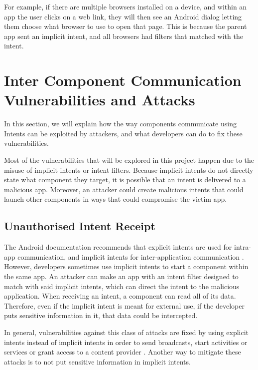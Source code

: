    For example, if there are multiple browsers installed on a device, and within an app the user clicks on a web link, they will then see an Android dialog letting them choose what browser to use to open that page. This is because the parent app sent an implicit intent, and all browsers had filters that matched with the intent.
    
    \section{Inter Component Communication Vulnerabilities and Attacks}
        \label{sec:icc_vulnerabilities_and_attacks}
        
    In this section, we will explain how the way components communicate using Intents can be exploited by attackers, and what developers can do to fix these vulnerabilities.
    
    Most of the vulnerabilities that will be explored in this project happen due to the misuse of implicit intents or intent filters. Because implicit intents do not directly state what component they target, it is possible that an intent is delivered to a malicious app. Moreover, an attacker could create malicious intents that could launch other components in ways that could compromise the victim app.
    
    \subsection{Unauthorised Intent Receipt}
        \label{subsec:unauthorised_intent_receipt}
        
    The Android documentation recommends that explicit intents are used for intra-app communication, and implicit intents for inter-application communication \cite{intents_and_intent_filters}. However, developers sometimes use implicit intents to start a component within the same app. An attacker can make an app with an intent filter designed to match with said implicit intents, which can direct the intent to the malicious application. When receiving an intent, a component can read all of its data. Therefore, even if the implicit intent is meant for external use, if the developer puts sensitive information in it, that data could be intercepted.
    
    In general, vulnerabilities against this class of attacks are fixed by using explicit intents instead of implicit intents in order to send broadcasts, start activities or services or grant access to a content provider \cite{2010_icc_paper}. Another way to mitigate these attacks is to not put sensitive information in implicit intents.
    
